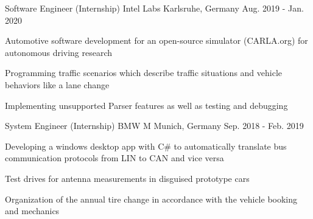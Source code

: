 \begin{cventries}
  \cventry
    {Software Engineer (Internship)} %
    {Intel Labs} %
    {Karlsruhe, Germany} %
    {Aug. 2019 - Jan. 2020} %
    {
      \begin{cvitems} %
      \item {Automotive software development for an open-source simulator (CARLA.org) for autonomous driving research}
        \item {Programming traffic scenarios which describe traffic situations and vehicle behaviors like a lane change}
        \item{Implementing unsupported Parser features as well as testing and debugging}
      \end{cvitems}
    }

  \cventry
    {System Engineer (Internship)} %
    {BMW M} %
    {Munich, Germany} %
    {Sep. 2018 - Feb. 2019} %
    {
      \begin{cvitems} %
        \item {Developing a windows desktop app with C\# to automatically translate bus communication protocols from LIN to CAN and vice versa}
        \item {Test drives for antenna measurements in disguised prototype cars}
        \item {Organization of the annual tire change in accordance with the vehicle booking and mechanics}
      \end{cvitems}
    }
\end{cventries}
